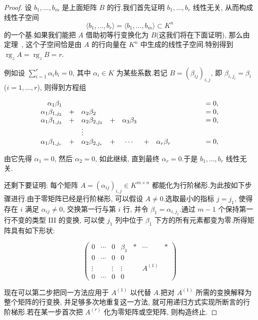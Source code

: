 \begin{proof}
设 $b_1, \ldots, b_m$ 是上面矩阵 $B$ 的行.我们首先证明 $b_1, \ldots, b_r$ 线性无关, 从而构成线性子空间
\[
\langle b_1, \ldots, b_r \rangle = \langle b_1, \ldots, b_m \rangle \subset K^n
\]
的一个基.如果我们能把 $A$ 借助初等行变换化为 $B$(这我们将在下面证明), 那么由定理~, 这个子空间恰是由 $A$ 的行向量在 $K^n$ 中生成的线性子空间.特别得到 $\operatorname{rg}_z A = \operatorname{rg}_z B = r$.

例如设 $\sum_{i = 1}^{r}\alpha_i b_i = 0$, 其中 $\alpha_i \in K$ 为某些系数.若记 $B = (\beta_{ij})_{i, j}$, 即 $\beta_{i, j_i} = \beta_i$ ($i = 1, \ldots, r$), 则得到方程组

\[
\begin{array}{r c l r c l r c l r c l}
\alpha_1\beta_1 & & & & & & & & & & & = 0, \\
\alpha_1\beta_{1, j_2} & + & \alpha_2\beta_2 & & & & & & & & & = 0, \\
\alpha_1\beta_{1, j_3} & + & \alpha_2\beta_{2, j_3} & + & \alpha_3\beta_3 & & & & & & & = 0, \\
& & \vdots & & & & & & & & & \\
\alpha_1\beta_{1, j_r} & + & \alpha_2\beta_{2, j_r} & + & \cdots & + & \alpha_r\beta_r & & & & & = 0,
\end{array}
\]

由它先得 $\alpha_1 = 0$, 然后 $\alpha_2 = 0$, 如此继续, 直到最终 $\alpha_r = 0$.于是 $b_1, \ldots, b_r$ 线性无关.

还剩下要证明: 每个矩阵 $A = (\alpha_{ij})_{i, j} \in K^{m \times n}$ 都能化为行阶梯形.为此按如下步骤进行.由于零矩阵已经是行阶梯形, 可以假设 $A \neq 0$.选取最小的指标 $j = j_1$, 使得存在 $i$ 满足 $\alpha_{ij} \neq 0$, 交换第一行与第 $i$ 行, 并令 $\beta_1 = \alpha_{i, j_1}$.通过 $m - 1$ 个保持第一行不变的类型 III 的变换, 可以使 $j_1$ 列中位于 $\beta_1$ 下方的所有元素都变为零.所得矩阵具有如下形状:

\[
\begin{pmatrix}
0 & \cdots & 0 & \beta_1 & * & \cdots & * \\
\hline
0 & \cdots & 0 & 0 & & \\
\vdots & & \vdots & \vdots & & A^{(1)} \\
0 & \cdots & 0 & 0 & &
\end{pmatrix}
\]

现在可以第二步把同一方法应用于 $A^{(1)}$ 以代替 $A$.把对 $A^{(1)}$ 所需的变换解释为整个矩阵的行变换, 并足够多次地重复这一方法, 就可用递归方式实现所断言的行阶梯形.若在某一步首次把 $A^{(r)}$ 化为零矩阵或空矩阵, 则构造终止.
\end{proof}

